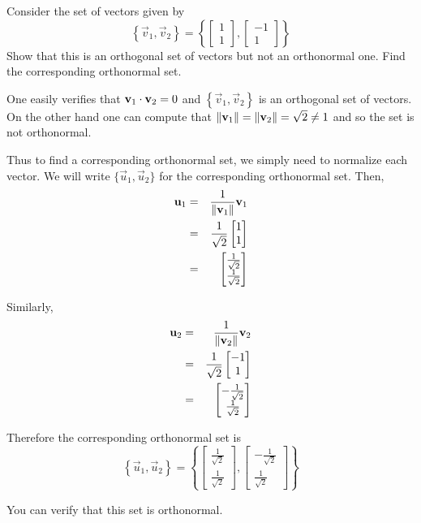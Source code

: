 \documentclass{ximera}
\begin{document}
\begin{example}\label{ex:orthonormalset}
Consider the set of vectors  given by
\[
\left\{ \vec{v}_1, \vec{v}_2 \right\} = \left\{
\begin{bmatrix}
1 \\
1
\end{bmatrix},
\begin{bmatrix}
-1 \\
1
\end{bmatrix}
\right\}
\]
Show that this is an orthogonal set of vectors  but not an orthonormal one. Find the corresponding orthonormal set.

\begin{explanation}
One easily verifies that $\mathbf{v}_1 \cdot \mathbf{v}_2 = 0$ and
$\left\{ \vec{v}_1, \vec{v}_2 \right\}$ is an orthogonal set of
vectors. On the other hand one can compute that ${\left\lVert\mathbf{v}_1\right\rVert}= {\left\lVert\mathbf{v}_2\right\rVert} =
\sqrt{2} \neq 1$ and so the set is not orthonormal.

Thus to find a corresponding orthonormal set, we simply need to
normalize each vector. We will write $\{ \vec{u}_1, \vec{u}_2 \}$
for the corresponding orthonormal set. Then,
\begin{eqnarray*}
\mathbf{u}_1 &=& \frac{1}{\left\lVert\mathbf{v}_1\right\rVert}\mathbf{v}_1\\
&=& \frac{1}{\sqrt{2}} \begin{bmatrix}
1 \\
1
\end{bmatrix} \\
&=&
\begin{bmatrix}
\frac{1}{\sqrt{2}} \\
\frac{1}{\sqrt{2}}
\end{bmatrix}
\end{eqnarray*}

Similarly,
\begin{eqnarray*}
\mathbf{u}_2 &=& \frac{1}{\left\lVert\mathbf{v}_2\right\rVert}\mathbf{v}_2\\
&=& \frac{1}{\sqrt{2}} \begin{bmatrix}
-1 \\
1
\end{bmatrix} \\
&=&
\begin{bmatrix}
-\frac{1}{\sqrt{2}} \\
\frac{1}{\sqrt{2}}
\end{bmatrix}
\end{eqnarray*}

Therefore the corresponding orthonormal set is
\[
\left\{ \vec{u}_1, \vec{u}_2 \right\} =
\left\{
\begin{bmatrix}
\frac{1}{\sqrt{2}} \\
\frac{1}{\sqrt{2}}
\end{bmatrix},
\begin{bmatrix}
-\frac{1}{\sqrt{2}} \\
\frac{1}{\sqrt{2}}
\end{bmatrix}
\right\}
\]

You can verify that this set is orthonormal.
\end{explanation}
\end{example}
\end{document}
